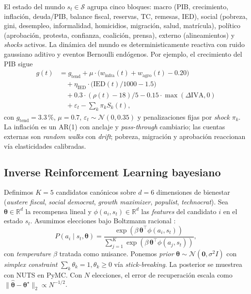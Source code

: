 \documentclass[conference]{IEEEtran}
\begin{document}
El estado del mundo $s_t \in \mathcal{S}$ agrupa cinco bloques: macro
(PIB, crecimiento, inflaci\'on, deuda/PIB, balance fiscal, reservas,
TC, remesas, IED), social (pobreza, gini, desempleo, informalidad,
homicidios, migraci\'on, salud, matr\'icula), pol\'itico (aprobaci\'on,
protesta, confianza, coalici\'on, prensa), externo (alineamientos) y
\emph{shocks} activos. La din\'amica del mundo es deterministicamente
reactiva con ruido gaussiano aditivo y eventos Bernoulli end\'ogenos.
Por ejemplo, el crecimiento del PIB sigue
\begin{align}
g(t) &= g_{\text{tend}} + \mu \cdot \big(w_{\text{infra}}(t) + w_{\text{agro}}(t) - 0.20\big) \nonumber \\
     &\quad + \eta_{\text{IED}} \cdot \big(\mathrm{IED}(t)/1000 - 1.5\big) \nonumber \\
     &\quad + 0.3 \cdot (\rho(t) - 18)/5 - 0.15 \cdot \max(\Delta\text{IVA}, 0) \nonumber \\
     &\quad + \varepsilon_t - \sum_{k} \pi_k S_k(t),
\label{eq:gdp}
\end{align}
con $g_{\text{tend}}{=}3.3\,\%$, $\mu{=}0.7$, $\varepsilon_t \sim
\mathcal{N}(0, 0.35)$ y penalizaciones fijas por \emph{shock}
$\pi_k$. La inflaci\'on es un AR(1) con anclaje y \emph{pass-through}
cambiario; las cuentas externas son \emph{random walks} con
\emph{drift}; pobreza, migraci\'on y aprobaci\'on reaccionan v\'ia
elasticidades calibradas.

\subsection{Inverse Reinforcement Learning bayesiano}

Definimos $K{=}5$ candidatos can\'onicos sobre $d{=}6$ dimensiones de
bienestar (\emph{austere fiscal}, \emph{social democrat},
\emph{growth maximizer}, \emph{populist}, \emph{technocrat}). Sea
$\boldsymbol{\theta}\in \mathbb{R}^d$ la recompensa lineal y
$\phi(a_i,s_t)\in\mathbb{R}^d$ las \emph{features} del candidato $i$
en el estado $s_t$. Asumimos elecciones bajo Boltzmann racional
\cite{ziebart2008}:
\begin{equation}
P(a_i \mid s_t, \boldsymbol{\theta}) = \frac{\exp(\beta\,\boldsymbol{\theta}^\top \phi(a_i,s_t))}{\sum_{j=1}^{K}\exp(\beta\,\boldsymbol{\theta}^\top \phi(a_j,s_t))},
\label{eq:boltzmann}
\end{equation}
con \emph{temperature} $\beta$ tratada como nuisance. Ponemos
\emph{prior} $\boldsymbol{\theta}\sim \mathcal{N}(\mathbf{0},\sigma^2 I)$
con \emph{simplex constraint} $\sum_k \theta_k {=} 1, \theta_k \ge 0$
v\'ia \emph{stick-breaking}. La posterior se muestrea con NUTS en
PyMC. Con $N$ elecciones, el error de recuperaci\'on escala como
$\|\hat{\boldsymbol{\theta}}-\boldsymbol{\theta}^\star\|_2 \propto N^{-1/2}$.
\end{document}
